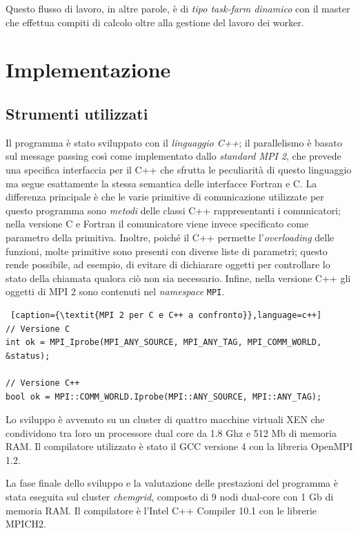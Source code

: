 \documentclass[12pt, a4paper, twosides]{report}
\begin{document}
Questo flusso di lavoro, in altre parole, è di \textit{tipo task-farm dinamico} con il master che  effettua compiti di calcolo oltre alla gestione del lavoro dei worker.






\chapter{Implementazione}

\section{Strumenti utilizzati}

Il programma è stato sviluppato con il \textit{linguaggio C++}; il parallelismo è basato sul message passing così come implementato dallo \textit{standard MPI 2}, che prevede una specifica interfaccia per il C++ che sfrutta le peculiarità di questo linguaggio ma segue esattamente la stessa semantica delle interfacce Fortran e C. La differenza principale è che le varie primitive di comunicazione utilizzate per questo programma sono \textit{metodi} delle classi C++ rappresentanti i comunicatori; nella versione C e Fortran il comunicatore viene invece specificato come parametro della primitiva. Inoltre, poiché il C++ permette l'\textit{overloading} delle funzioni, molte primitive sono presenti con diverse liste di parametri; questo rende possibile, ad esempio, di evitare di dichiarare oggetti per controllare lo stato della chiamata qualora ciò non sia necessario. Infine, nella versione C++ gli oggetti di MPI 2 sono contenuti nel \textit{namespace} \verb|MPI|.

\vspace*{10pt}
\begin{lstlisting} [caption={\textit{MPI 2 per C e C++ a confronto}},language=c++]
// Versione C
int ok = MPI_Iprobe(MPI_ANY_SOURCE, MPI_ANY_TAG, MPI_COMM_WORLD, &status);

// Versione C++
bool ok = MPI::COMM_WORLD.Iprobe(MPI::ANY_SOURCE, MPI::ANY_TAG);
\end{lstlisting}

Lo sviluppo è avvenuto su un cluster di quattro macchine virtuali XEN che condividono tra loro un processore dual core da 1.8 Ghz e 512 Mb di memoria RAM. Il compilatore utilizzato è stato il GCC versione 4 con la libreria OpenMPI 1.2.

La fase finale dello sviluppo e la valutazione delle prestazioni del programma è stata eseguita sul cluster \textit{chemgrid}, composto di 9 nodi dual-core con 1 Gb di memoria RAM. Il compilatore è l'Intel C++ Compiler 10.1 con le librerie MPICH2.
\end{document}
